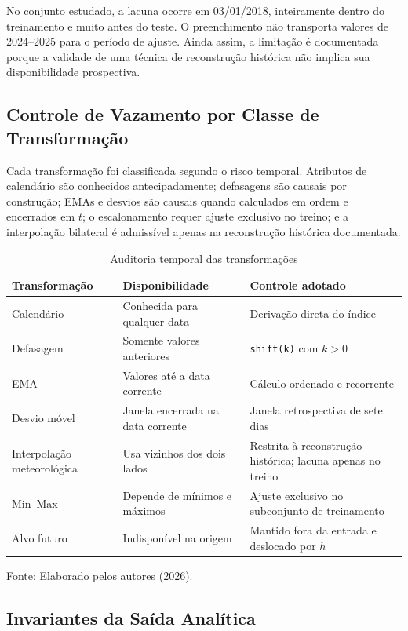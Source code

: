 No conjunto estudado, a lacuna ocorre em 03/01/2018, inteiramente dentro do treinamento e muito antes do teste. O preenchimento não transporta valores de 2024--2025 para o período de ajuste. Ainda assim, a limitação é documentada porque a validade de uma técnica de reconstrução histórica não implica sua disponibilidade prospectiva.

\subsection{Controle de Vazamento por Classe de Transformação}

Cada transformação foi classificada segundo o risco temporal. Atributos de calendário são conhecidos antecipadamente; defasagens são causais por construção; EMAs e desvios são causais quando calculados em ordem e encerrados em $t$; o escalonamento requer ajuste exclusivo no treino; e a interpolação bilateral é admissível apenas na reconstrução histórica documentada.

\begin{table}[H]
\centering
\caption{Auditoria temporal das transformações}
\label{tab:auditoria_transformacoes}
\small
\begin{tabularx}{\textwidth}{p{3.5cm} p{3.0cm} X}
\toprule
\textbf{Transformação} & \textbf{Disponibilidade} & \textbf{Controle adotado} \\
\midrule
Calendário & Conhecida para qualquer data & Derivação direta do índice \\
Defasagem & Somente valores anteriores & \texttt{shift(k)} com $k>0$ \\
EMA & Valores até a data corrente & Cálculo ordenado e recorrente \\
Desvio móvel & Janela encerrada na data corrente & Janela retrospectiva de sete dias \\
Interpolação meteorológica & Usa vizinhos dos dois lados & Restrita à reconstrução histórica; lacuna apenas no treino \\
Min--Max & Depende de mínimos e máximos & Ajuste exclusivo no subconjunto de treinamento \\
Alvo futuro & Indisponível na origem & Mantido fora da entrada e deslocado por $h$ \\
\bottomrule
\end{tabularx}
\small{Fonte: Elaborado pelos autores (2026).}
\end{table}

\subsection{Invariantes da Saída Analítica}

